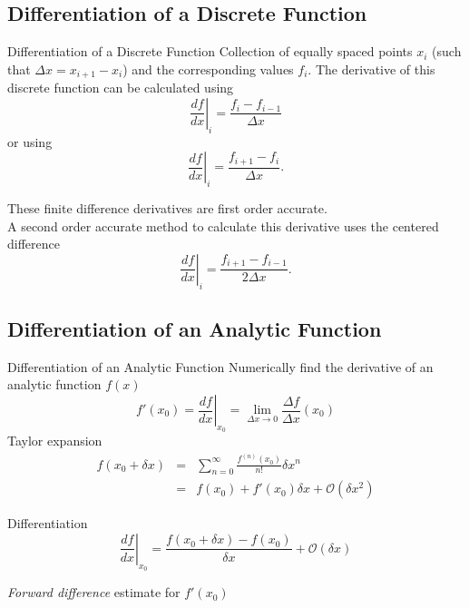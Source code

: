 \documentclass[11pt]{beamer}
\begin{document}
\subsection{Differentiation of a Discrete Function}
\begin{frame}[fragile]{Differentiation of a Discrete Function}
Collection of equally spaced points $x_i$ (such that $\Delta x = x_{i+1} - x_i$) and the corresponding values $f_i$. The derivative of this discrete function can be calculated using
\pause
\begin{equation}
\left. \frac{df}{dx} \right|_i = \frac{f_i - f_{i-1}}{\Delta x} 
\end{equation}
or using
\begin{equation}
\left. \frac{df}{dx} \right|_i = \frac{f_{i+1} - f_i}{\Delta x}. 
\end{equation}

These finite difference derivatives are first order accurate.\\
\pause
A second order accurate method to calculate this derivative uses the centered difference
\pause
\begin{equation}
\left. \frac{df}{dx} \right|_i = \frac{f_{i+1} - f_{i-1}}{2 \Delta x}. 
\end{equation}
\end{frame}

\subsection{Differentiation of an Analytic Function}
\begin{frame}[fragile]{Differentiation of an Analytic Function}
Numerically find the derivative of an analytic function $f(x)$
\pause
\begin{equation}
f'(x_0) = \left. \frac{df}{dx} \right|_{x_0} = \lim_{\Delta x \rightarrow 0} \frac{\Delta f}{\Delta x} (x_0)
\end{equation}
\pause
Taylor expansion
\begin{eqnarray}
f(x_0 + \delta x) &=& \sum_{n=0}^\infty \frac{f^{(n)} (x_0)}{n!} \delta x^n \\
                 &=& f(x_0) +  f'(x_0) \delta x + \mathcal{O} (\delta x^2)
\end{eqnarray}
\end{frame}

\begin{frame}[fragile]{Differentiation}
\begin{equation}
\left. \frac{df}{dx} \right|_{x_0} = \frac{f(x_0 + \delta x) - f(x_0)}{\delta x} + \mathcal{O} (\delta x)
\end{equation}
\pause
\begin{center}
\textit{Forward difference} estimate for $f'(x_0)$
\end{center} 
\end{frame}
\end{document}
